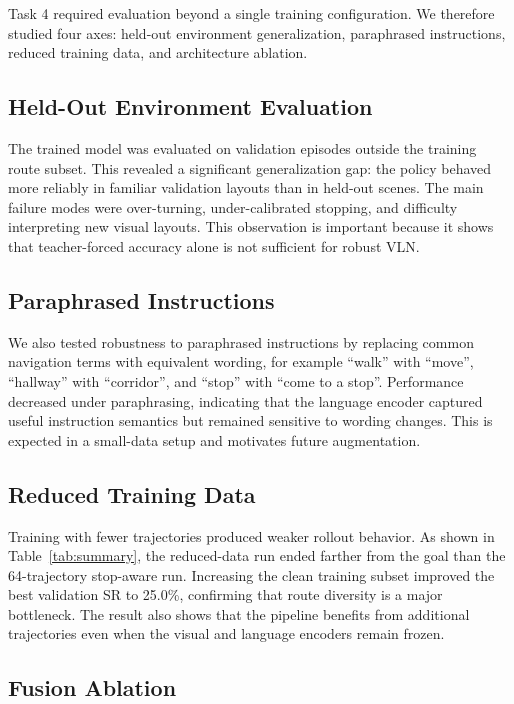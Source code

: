 Task 4 required evaluation beyond a single training configuration. We therefore studied four axes: held-out environment generalization, paraphrased instructions, reduced training data, and architecture ablation.

\subsection{Held-Out Environment Evaluation}

The trained model was evaluated on validation episodes outside the training route subset. This revealed a significant generalization gap: the policy behaved more reliably in familiar validation layouts than in held-out scenes. The main failure modes were over-turning, under-calibrated stopping, and difficulty interpreting new visual layouts. This observation is important because it shows that teacher-forced accuracy alone is not sufficient for robust VLN.

\subsection{Paraphrased Instructions}

We also tested robustness to paraphrased instructions by replacing common navigation terms with equivalent wording, for example ``walk'' with ``move'', ``hallway'' with ``corridor'', and ``stop'' with ``come to a stop''. Performance decreased under paraphrasing, indicating that the language encoder captured useful instruction semantics but remained sensitive to wording changes. This is expected in a small-data setup and motivates future augmentation.

\subsection{Reduced Training Data}

Training with fewer trajectories produced weaker rollout behavior. As shown in Table~\ref{tab:summary}, the reduced-data run ended farther from the goal than the 64-trajectory stop-aware run. Increasing the clean training subset improved the best validation SR to 25.0\%, confirming that route diversity is a major bottleneck. The result also shows that the pipeline benefits from additional trajectories even when the visual and language encoders remain frozen.

\subsection{Fusion Ablation}

